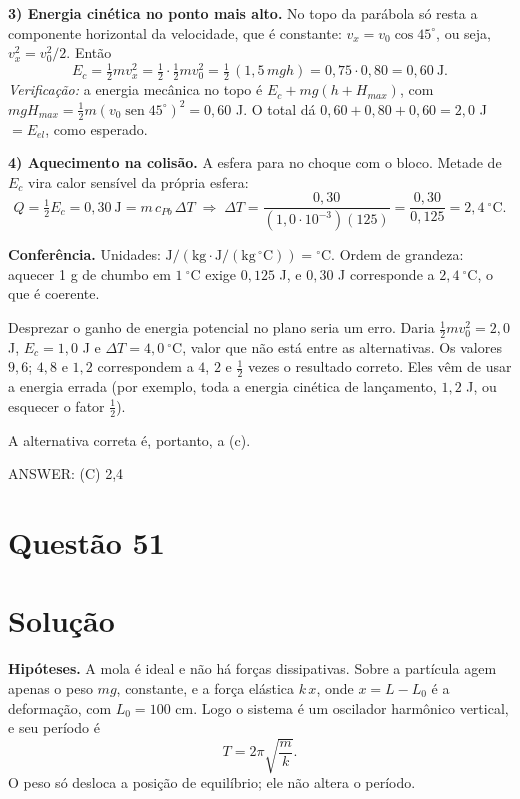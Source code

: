 \documentclass{article}%
\begin{document}
\textbf{3) Energia cinética no ponto mais alto.} No topo da parábola só resta a componente horizontal da velocidade, que é constante: $v_x = v_0\cos 45^\circ$, ou seja, $v_x^2 = v_0^2/2$. Então
\[
E_c = \tfrac12 m v_x^2 = \tfrac12\cdot\tfrac12 m v_0^2 = \tfrac12\,(1{,}5\,mgh) = 0{,}75\cdot 0{,}80 = 0{,}60\ \text{J}.
\]
\emph{Verificação:} a energia mecânica no topo é $E_c + mg(h + H_{max})$, com $mgH_{max} = \tfrac12 m (v_0\operatorname{sen}45^\circ)^2 = 0{,}60$ J. O total dá $0{,}60 + 0{,}80 + 0{,}60 = 2{,}0$ J $= E_{el}$, como esperado.

\textbf{4) Aquecimento na colisão.} A esfera para no choque com o bloco. Metade de $E_c$ vira calor sensível da própria esfera:
\[
Q = \tfrac12 E_c = 0{,}30\ \text{J} = m\,c_{Pb}\,\Delta T
\;\Longrightarrow\;
\Delta T = \frac{0{,}30}{(1{,}0\cdot 10^{-3})(125)} = \frac{0{,}30}{0{,}125} = 2{,}4\ ^\circ\text{C}.
\]

\textbf{Conferência.} Unidades: $\text{J}/(\text{kg}\cdot\text{J}/(\text{kg}\,^\circ\text{C})) = {}^\circ\text{C}$. Ordem de grandeza: aquecer 1 g de chumbo em $1\ ^\circ$C exige $0{,}125$ J, e $0{,}30$ J corresponde a $2{,}4\ ^\circ$C, o que é coerente.

Desprezar o ganho de energia potencial no plano seria um erro. Daria $\tfrac12 m v_0^2 = 2{,}0$ J, $E_c = 1{,}0$ J e $\Delta T = 4{,}0\ ^\circ$C, valor que não está entre as alternativas. Os valores $9{,}6$; $4{,}8$ e $1{,}2$ correspondem a $4$, $2$ e $\tfrac12$ vezes o resultado correto. Eles vêm de usar a energia errada (por exemplo, toda a energia cinética de lançamento, $1{,}2$ J, ou esquecer o fator $\tfrac12$).

A alternativa correta é, portanto, a (c).

ANSWER: (C) 2,4%
\newpage%
\section*{Questão 51}

\section*{Solução}

\textbf{Hipóteses.} A mola é ideal e não há forças dissipativas. Sobre a partícula agem apenas o peso $mg$, constante, e a força elástica $k\,x$, onde $x = L - L_0$ é a deformação, com $L_0 = 100$ cm. Logo o sistema é um oscilador harmônico vertical, e seu período é
\[
T = 2\pi\sqrt{\frac{m}{k}} .
\]
O peso só desloca a posição de equilíbrio; ele não altera o período.
\end{document}
